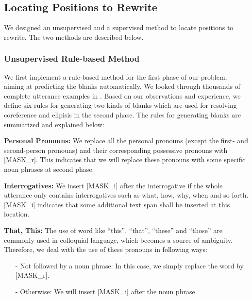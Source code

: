  









\subsection{Locating Positions to Rewrite}

We designed an unsupervised and a supervised method to locate positions to rewrite. The two methods are described below.


\subsubsection{Unsupervised Rule-based Method}
\label{sec:ruolan-rule}
We first implement a rule-based method for the first phase
of our problem, aiming at predicting the blanks automatically.
We looked through thousands of complete utterance examples
in \citet{elgohary-etal-2019-unpack}. 
Based on our observations
and experience,
we define six rules for generating 
two kinds of blanks which are used for 
resolving coreference and ellpisis
in the second phase.
The rules for generating blanks are 
summarized and explained below:

\noindent
\textbf{Personal Pronouns:} We replace all the personal pronouns
(except the first- and second-person pronouns)
 and their 
corresponding possessive pronouns with
[MASK\_r].
This indicates that we will replace these pronouns with
some specific noun phrases at second phase.

\noindent
\textbf{Interrogatives:}
We insert [MASK\_i] after the 
interrogative
if the whole utterance only contains 
interrogatives such as what, how, why, when
and so forth. [MASK\_i] indicates that some additional
text span shall be inserted at this location.

\noindent
\textbf{That, This:}
The use of word like ``this'', ``that'', ``these'' and ``those''
are commonly used in colloquial language,
which becomes a source of ambiguity.
Therefore, we deal with the use of these pronouns in following ways:
\begin{itemize}
\item[-] Not followed by a noun phrase: In this case, we simply replace the word by [MASK\_r].
\item[-] Otherwise: We will insert [MASK\_i] after the noun phrase.
\end{itemize}

